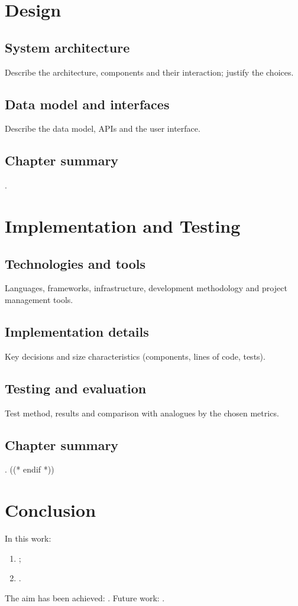 \documentclass[12pt,a4paper]{extreport}
\begin{document}
\clearpage
\chapter{Design}
\section{System architecture}
Describe the architecture, components and their interaction; justify the choices.

\section{Data model and interfaces}
Describe the data model, APIs and the user interface.

\section{Chapter summary}
.

\clearpage
\chapter{Implementation and Testing}
\section{Technologies and tools}
Languages, frameworks, infrastructure, development methodology and project
management tools.

\section{Implementation details}
Key decisions and size characteristics (components, lines of code, tests).

\section{Testing and evaluation}
Test method, results and comparison with analogues by the chosen metrics.

\section{Chapter summary}
.
((* endif *))

\clearpage
\chapter*{Conclusion}
In this work:
\begin{enumerate}[label=\arabic*), leftmargin=1.25cm]
  \item {};
  \item {}.
\end{enumerate}
The aim has been achieved: .
Future work: .
\end{document}
